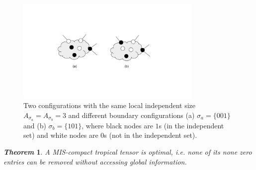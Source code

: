 \documentclass{article}
\newcommand{\<}{\langle}
\renewcommand{\>}{\rangle}
\newtheorem{theorem}{\textit{Theorem}}
\theoremstyle{definition}\newtheorem{definition}{\textit{Definition}}
\begin{document}
\begin{figure}
    \centering
    \includegraphics[width=0.8\textwidth, trim={5cm 4cm 5cm 4cm}, clip]{compressionrule.pdf}
    \caption{Two configurations with the same local independent size $A_{\sigma_a} = A_{\sigma_b} = 3$ and different boundary configurations (a) $\sigma_a=\{001\}$ and (b) $\sigma_b = \{101\}$, where black nodes are $1$s (in the independent set) and white nodes are $0$s (not in the independent set).}\label{fig:compressrule}
\end{figure}

\begin{theorem}
    A MIS-compact tropical tensor is optimal, i.e. none of its none zero entries can be removed without accessing global information.
\end{theorem}
\end{document}
